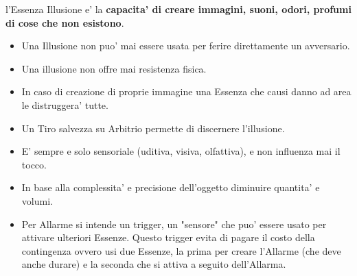 \documentclass[a4paper,11pt,twoside,openany]{book}
\begin{document}
\label{essenza-illusione---magnetismo}

l'Essenza Illusione e' la \textbf{capacita' di creare immagini, suoni,
odori, profumi di cose che non esistono}.
\begin{itemize}
\item 
Una Illusione non puo' mai essere usata per ferire direttamente un avversario. 
\item 
Una illusione non offre mai resistenza fisica. 
\item 
In caso di creazione di proprie immagine una Essenza che causi danno ad area le distruggera' tutte. 
\item 
Un Tiro salvezza su Arbitrio permette di discernere l'illusione. 
\item 
E' sempre e solo sensoriale (uditiva, visiva, olfattiva), e non influenza mai il tocco. 
\item 
In base alla complessita' e precisione dell'oggetto diminuire quantita' e volumi. 
\item 
Per Allarme si intende un trigger, un "sensore" che puo' essere usato per attivare ulteriori Essenze. Questo trigger evita di pagare il costo della contingenza ovvero usi due Essenze, la prima per creare l'Allarme (che deve anche durare) e la seconda che si attiva a seguito
dell'Allarma. 
\end{itemize}

\bigskip
\end{document}
